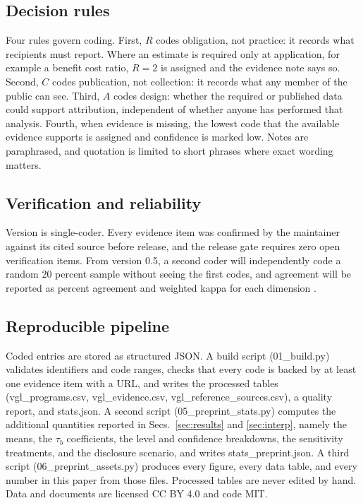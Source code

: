 \documentclass[10pt,twocolumn,letterpaper]{article}
\begin{document}
\subsection{Decision rules}

Four rules govern coding. First, $R$ codes obligation, not practice: it records what recipients must report. Where an estimate is required only at application, for example a benefit cost ratio, $R = 2$ is assigned and the evidence note says so. Second, $C$ codes publication, not collection: it records what any member of the public can see. Third, $A$ codes design: whether the required or published data could support attribution, independent of whether anyone has performed that analysis. Fourth, when evidence is missing, the lowest code that the available evidence supports is assigned and confidence is marked low. Notes are paraphrased, and quotation is limited to short phrases where exact wording matters.

\subsection{Verification and reliability}

Version \vglVersion{} is single-coder. Every evidence item was confirmed by the maintainer against its cited source before release, and the release gate requires zero open verification items. From version 0.5, a second coder will independently code a random 20 percent sample without seeing the first codes, and agreement will be reported as percent agreement and weighted kappa for each dimension \cite{cohen1968}.

\subsection{Reproducible pipeline}

Coded entries are stored as structured JSON. A build script (01\_build.py) validates identifiers and code ranges, checks that every code is backed by at least one evidence item with a URL, and writes the processed tables (vgl\_programs.csv, vgl\_evidence.csv, vgl\_reference\_sources.csv), a quality report, and stats.json. A second script (05\_preprint\_stats.py) computes the additional quantities reported in Secs.~\ref{sec:results} and \ref{sec:interp}, namely the means, the $\tau_b$ coefficients, the level and confidence breakdowns, the sensitivity treatments, and the disclosure scenario, and writes stats\_preprint.json. A third script (06\_preprint\_assets.py) produces every figure, every data table, and every number in this paper from those files. Processed tables are never edited by hand. Data and documents are licensed CC BY 4.0 and code MIT.
\end{document}
